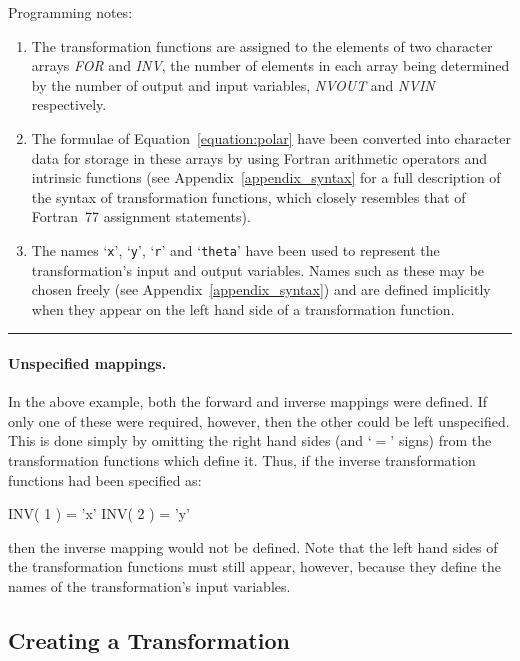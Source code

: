 \documentclass[twoside,nolof,11pt]{starlink}
\providecommand{\fortvar}[1]{\emph{#1}}
\providecommand{\exampledone}[0]{\begin{center} \rule{6em}{0.2mm} \end{center}}
\begin{document}
Programming notes:

\begin{enumerate}

\item  The transformation functions are assigned to the elements of two
character arrays \fortvar{FOR} and \fortvar{INV}, the number of elements in
each array being determined by the number of output and input variables,
\fortvar{NVOUT} and \fortvar{NVIN} respectively.

\item The formulae of Equation~\ref{equation:polar} have been converted into
character data for storage in these arrays by using Fortran arithmetic
operators and intrinsic functions (see Appendix~\ref{appendix_syntax} for a
full description of the syntax of transformation functions, which closely
resembles that of Fortran~77 assignment statements).

\item The names `\verb#x#', `\verb#y#', `\verb#r#' and `\verb#theta#' have
been used to represent the transformation's input and output variables.
Names such as these may be chosen freely (see
Appendix~\ref{appendix_syntax}) and are defined implicitly when they appear
on the left hand side of a transformation function.

\end{enumerate}
\exampledone

\paragraph{Unspecified mappings.}
In the above example, both the forward and inverse mappings were defined.
If only one of these were required, however, then the other could be left
unspecified.
This is done simply by omitting the right hand sides (and `$=$' signs) from
the transformation functions which define it.
Thus, if the inverse transformation functions had been specified as:

\begin{terminalv}
INV( 1 ) = 'x'
INV( 2 ) = 'y'
\end{terminalv}

then the inverse mapping would not be defined.
Note that the left hand sides of the transformation functions must still
appear, however, because they define the names of the transformation's input
variables.


\subsection{Creating a Transformation}
\label{section:simple:creating}
\end{document}
